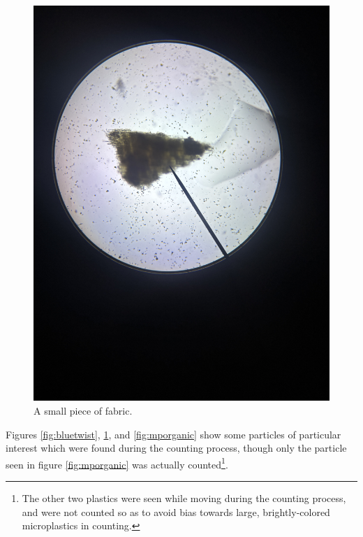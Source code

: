 \documentclass[fleqn,10pt]{SelfArx} %
\begin{document}
	\begin{figure}[h]
		\centering
		\includegraphics[width=1\linewidth]{Figures/Fabric}
		\caption[Fabric Under Microscope]{A small piece of fabric.}
		\label{fig:fabric}
	\end{figure}
	Figures \ref{fig:bluetwist}, \ref{fig:fabric}, and \ref{fig:mporganic} show some particles of particular interest which were found during the counting process, though only the particle seen in figure \ref{fig:mporganic} was actually counted\footnote{The other two plastics were seen while moving during the counting process, and were not counted so as to avoid bias towards large, brightly-colored microplastics in counting.}.
	

	
	
\end{document}
